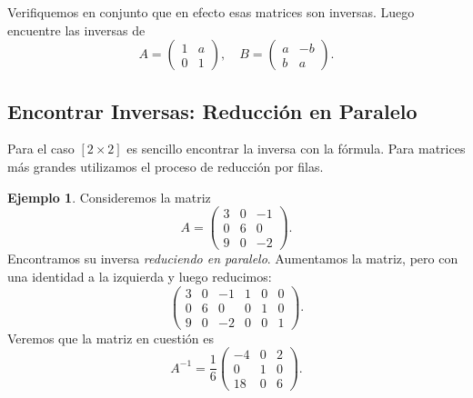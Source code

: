 \documentclass[12pt]{article}
\theoremstyle{plain}
\theoremstyle{definition}
\newtheorem{Ex}[Th]{Ejemplo}           %
\theoremstyle{remark}
\newcommand{\x}{\times}             %
\renewcommand{\:}{\colon}           %
\renewcommand{\.}{\Cdot}                %
\begin{document}
\begin{multicols}{2}
\begin{ptcbP}
  Verifiquemos en conjunto que en efecto esas matrices son inversas. Luego encuentre las inversas de 
  $$A=\begin{pmatrix}
    1&a\\0&1
  \end{pmatrix},\quad B=\begin{pmatrix}
    a&-b\\b&a
  \end{pmatrix}.$$
\end{ptcbP}
\vfill\null\columnbreak
\subsection*{Encontrar Inversas: Reducción en Paralelo}

Para el caso $[2\x 2]$ es sencillo encontrar la inversa con la fórmula. Para matrices más grandes utilizamos el proceso de reducción por filas.

\begin{Ex}
  Consideremos la matriz
  $$A=\begin{pmatrix}
    3&0&-1\\ 0&6&0\\
    9&0&-2
  \end{pmatrix}.$$
  Encontramos su inversa \emph{reduciendo en paralelo}. Aumentamos la matriz, pero con una identidad a la izquierda y luego reducimos:
$$\left(\begin{array}{ccc|ccc}
  3&0&-1&1&0&0\\ 0&6&0&0&1&0\\
    9&0&-2&0&0&1
\end{array}\right).$$
Veremos que la matriz en cuestión es 
$$A^{-1}=\frac{1}{6}\begin{pmatrix}
  -4&0&2\\0&1&0\\18&0&6
\end{pmatrix}.$$
\end{Ex}
\end{multicols}
\end{document}
